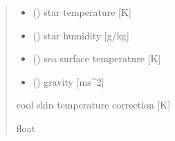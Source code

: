 \documentclass[letterpaper,10pt,english]{sphinxmanual}
\begin{document}
\begin{fulllineitems}
\begin{quote}
\begin{description}
\begin{itemize}
\item {}
\sphinxAtStartPar
{} () \textendash{} star temperature              {[}K{]}

\item {}
\sphinxAtStartPar
{} () \textendash{} star humidity                 {[}g/kg{]}

\item {}
\sphinxAtStartPar
{} () \textendash{} sea surface temperature  {[}K{]}

\item {}
\sphinxAtStartPar
{} () \textendash{} gravity                      {[}ms\textasciicircum{}\sphinxhyphen{}2{]}

\end{itemize}

\sphinxAtStartPar
{} \textendash{} cool skin temperature correction {[}K{]}

\sphinxAtStartPar
float

\end{description}\end{quote}

\end{fulllineitems}

\end{document}
